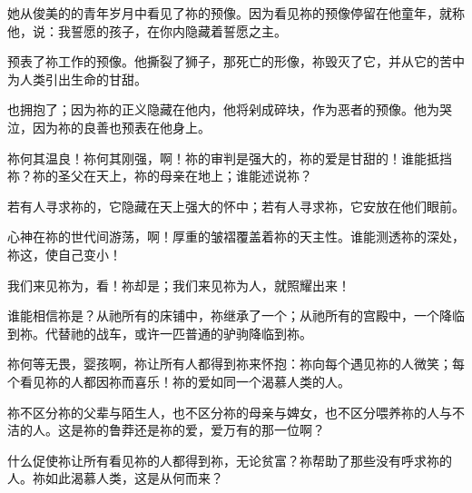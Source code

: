 她从俊美的的青年岁月中看见了祢的预像。因为看见祢的预像停留在他童年，就称他，说：我誓愿的孩子，在你内隐藏着誓愿之主。\par

预表了祢工作的预像。他撕裂了狮子，那死亡的形像，祢毁灭了它，并从它的苦中为人类引出生命的甘甜。\par

也拥抱了；因为祢的正义隐藏在他内，他将剁成碎块，作为恶者的预像。他为哭泣，因为祢的良善也预表在他身上。\par

祢何其温良！祢何其刚强，啊！祢的审判是强大的，祢的爱是甘甜的！谁能抵挡祢？祢的圣父在天上，祢的母亲在地上；谁能述说祢？\par

若有人寻求祢的，它隐藏在天上强大的怀中；若有人寻求祢，它安放在他们眼前。\par

心神在祢的世代间游荡，啊！厚重的皱褶覆盖着祢的天主性。谁能测透祢的深处，祢这，使自己变小！\par

我们来见祢为，看！祢却是；我们来见祢为人，就照耀出来！\par

谁能相信祢是？从祂所有的床铺中，祢继承了一个；从祂所有的宫殿中，一个降临到祢。代替祂的战车，或许一匹普通的驴驹降临到祢。\par

祢何等无畏，婴孩啊，祢让所有人都得到祢来怀抱：祢向每个遇见祢的人微笑；每个看见祢的人都因祢而喜乐！祢的爱如同一个渴慕人类的人。\par

祢不区分祢的父辈与陌生人，也不区分祢的母亲与婢女，也不区分喂养祢的人与不洁的人。这是祢的鲁莽还是祢的爱，爱万有的那一位啊？\par

什么促使祢让所有看见祢的人都得到祢，无论贫富？祢帮助了那些没有呼求祢的人。祢如此渴慕人类，这是从何而来？\par

